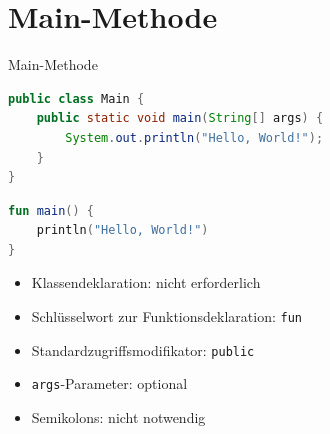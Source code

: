 \documentclass{beamer}
\begin{document}
\section{Main-Methode}
\begin{frame}[fragile]{Main-Methode}
  \begin{lstlisting}[language=Java, title=Java Main-Methode, xleftmargin=1em]
public class Main {
    public static void main(String[] args) {
        System.out.println("Hello, World!");
    }
}
  \end{lstlisting}
  \pause\begin{lstlisting}[language=Kotlin, title=Kotlin Main-Methode, xleftmargin=1em]
fun main() {
    println("Hello, World!")
}
  \end{lstlisting}
  \pause[]\begin{itemize}[<+->]
      \item Klassendeklaration: nicht erforderlich %
      \item Schlüsselwort zur Funktionsdeklaration: \texttt{fun}
      \item Standardzugriffsmodifikator: \texttt{public}
      \item \texttt{args}-Parameter: optional
      \item Semikolons: nicht notwendig
    \end{itemize}
    \vspace{1cm}
\end{frame}
\end{document}
